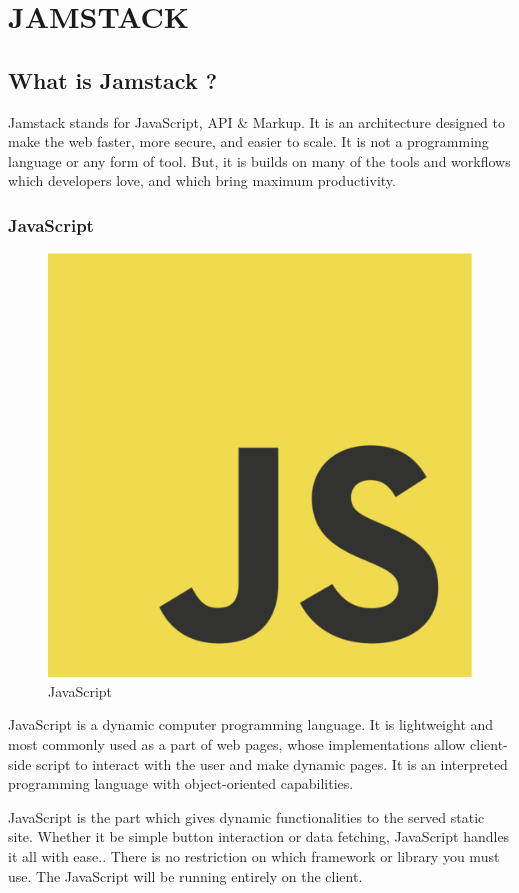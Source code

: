 \documentclass[12pt,a4paper,oneside]{report}
\begin{document}
\chapter{JAMSTACK}
\section{What is Jamstack ?}
Jamstack stands for JavaScript, API \& Markup. It is an architecture designed to make the web faster, more secure, and easier to scale. It is not a programming language or any form of tool. But, it is builds on many of the tools and workflows which developers love, and which bring maximum productivity.

\subsection{JavaScript}
\begin{figure}[H]
    \centering
    \includegraphics[scale=.2]{images/javascript.png}
    \caption{JavaScript\cite{js}}
\end{figure}
\par 
JavaScript is a dynamic computer programming language. It is lightweight and most commonly used as a part of web pages, whose implementations allow client-side script to interact with the user and make dynamic pages. It is an interpreted programming language with object-oriented capabilities.
\par
JavaScript is the part which gives dynamic functionalities to the served static site. Whether it be simple button interaction or data fetching, JavaScript handles it all with ease.. There is no restriction on which framework or library you must use. The JavaScript will be running entirely on the client.
\end{document}
